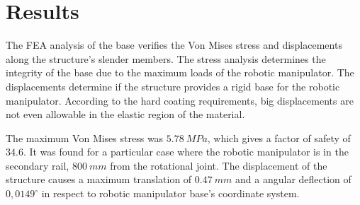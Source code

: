 \section{Results}




The FEA analysis of the base verifies the Von Mises stress and displacements
along the structure's slender members. The stress analysis determines the
integrity of the base due to the maximum loads of the robotic manipulator. The
displacements determine if the structure provides a rigid base for the robotic
manipulator. According to the hard coating requirements, big displacements are
not even allowable in the elastic region of the material. %

The maximum Von Mises stress was $5.78~MPa$, which gives a factor of safety of
$34.6$. It was found for a particular case where the robotic manipulator is in
the secondary rail, $800~mm$ from the rotational joint. The displacement of the
structure causes a maximum translation of $0.47~mm$ and a angular deflection of
$0,0149^{\circ}$ in respect to robotic manipulator base's coordinate system.

